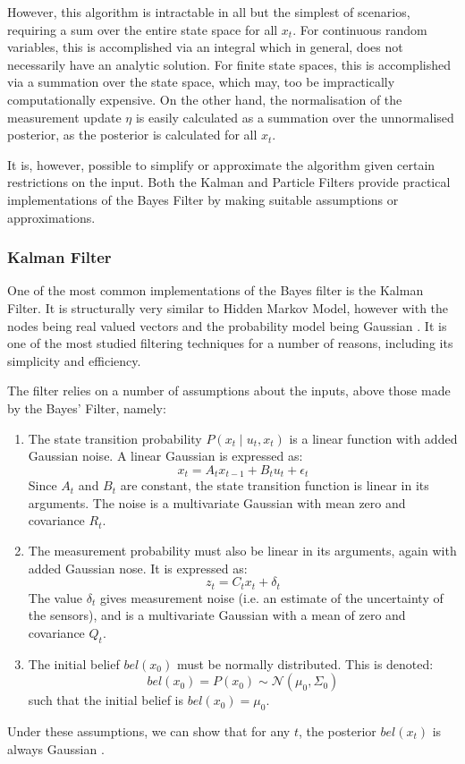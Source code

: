 \documentclass[english]{article}
\begin{document}
However, this algorithm is intractable in all but the simplest of scenarios, requiring a sum over the entire state space for all $x_t$. For continuous random variables, this is accomplished via an integral which in general, does not necessarily have an analytic solution. For finite state spaces, this is accomplished via a summation over the state space, which may, too be impractically computationally expensive. On the other hand, the normalisation of the measurement update $\eta$ is easily calculated as a summation over the unnormalised posterior, as the posterior is calculated for all $x_t$.

It is, however, possible to simplify or approximate the algorithm given certain restrictions on the input. Both the Kalman and Particle Filters provide practical implementations of the Bayes Filter by making suitable assumptions or approximations.

\subsubsection{Kalman Filter}
\label{sec:kalfilter}
One of the most common implementations of the Bayes filter is the Kalman Filter. It is structurally very similar to Hidden Markov Model, however with the nodes being real valued vectors and the probability model being Gaussian \cite{kalfilter}. It is one of the most studied filtering techniques for a number of reasons, including its simplicity and efficiency.

The filter relies on a number of assumptions about the inputs, above those made by the Bayes' Filter, namely:
\begin{enumerate}
	\item The state transition probability $P(x_{t} \mid u_t,x_t)$ is a linear function with added Gaussian noise. A linear Gaussian is expressed as:
		\begin{equation}
			x_{t} = A_{t} x_{t-1} + B_{t} u_{t} + \epsilon _{t}
		\end{equation}
		Since $A_{t}$ and $B_{t}$ are constant, the state transition function is linear in its arguments. The noise is a multivariate Gaussian with mean zero and covariance $R_t$.
	\item The measurement probability must also be linear in its arguments, again with added Gaussian nose. It is expressed as:
		\begin{equation}
			z_{t} = C_{t} x_{t} + \delta _{t}
		\end{equation}
		The value $\delta_t$ gives measurement noise (i.e. an estimate of the uncertainty of the sensors), and is a multivariate Gaussian with a mean of zero and covariance $Q_t$.
	\item The initial belief $bel(x_0)$ must be normally distributed. This is denoted:
		\begin{equation}
			bel(x_0) = P(x_0) \sim \mathcal{N}(\mu_0, \Sigma_0)
		\end{equation}
		such that the initial belief is $bel(x_0)=\mu_0$.
\end{enumerate}
Under these assumptions, we can show that for any $t$, the posterior $bel(x_{t})$ is always Gaussian \cite{kalmanderiv}.
\end{document}

